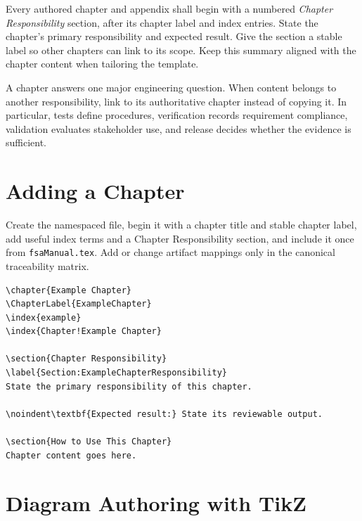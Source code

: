Every authored chapter and appendix shall begin with a numbered
\textit{Chapter Responsibility} section, after its chapter label and index
entries. State the chapter's primary responsibility and expected result. Give
the section a stable label so other chapters can link to its scope. Keep this
summary aligned with the chapter content when tailoring the template.

A chapter answers one major engineering question. When content belongs
to another responsibility, link to its authoritative chapter instead of
copying it. In particular, tests define procedures, verification records
requirement compliance, validation evaluates stakeholder use, and release
decides whether the evidence is sufficient.

\section{Adding a Chapter}

Create the namespaced file, begin it with a chapter title and stable chapter
label, add useful index terms and a Chapter Responsibility section, and include it once from
\texttt{fsaManual.tex}. Add or change artifact mappings only in the canonical
traceability matrix.

\begin{verbatim}
\chapter{Example Chapter}
\ChapterLabel{ExampleChapter}
\index{example}
\index{Chapter!Example Chapter}

\section{Chapter Responsibility}
\label{Section:ExampleChapterResponsibility}
State the primary responsibility of this chapter.

\noindent\textbf{Expected result:} State its reviewable output.

\section{How to Use This Chapter}
Chapter content goes here.
\end{verbatim}

\section{Diagram Authoring with TikZ}
\label{Section:TikZAuthoring}


